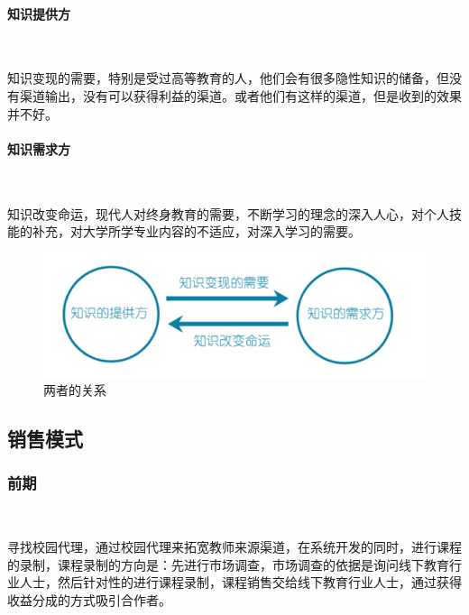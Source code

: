 \paragraph{知识提供方}\

知识变现的需要，特别是受过高等教育的人，他们会有很多隐性知识的储备，但没有渠道输出，没有可以获得利益的渠道。或者他们有这样的渠道，但是收到的效果并不好。

\paragraph{知识需求方}\

知识改变命运，现代人对终身教育的需要，不断学习的理念的深入人心，对个人技能的补充，对大学所学专业内容的不适应，对深入学习的需要。

\begin{figure}[H]
	\centering
	\includegraphics[width=0.9\columnwidth]{figures/relationship}
	\caption{两者的关系}
	\label{fg:relationship}
\end{figure}


\subsection{销售模式}

\subsubsection{前期}\

寻找校园代理，通过校园代理来拓宽教师来源渠道，在系统开发的同时，进行课程的录制，课程录制的方向是：先进行市场调查，市场调查的依据是询问线下教育行业人士，然后针对性的进行课程录制，课程销售交给线下教育行业人士，通过获得收益分成的方式吸引合作者。

